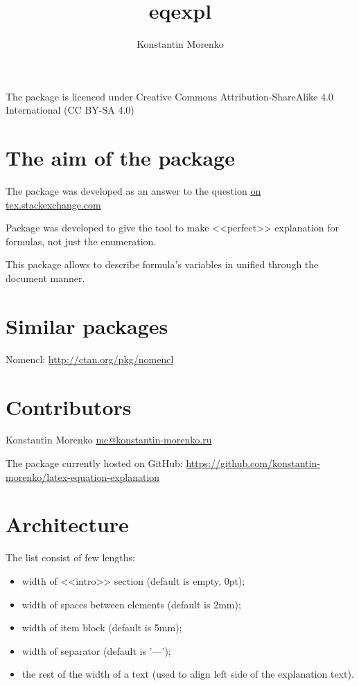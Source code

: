 \documentclass{article}
\begin{document}
\title{eqexpl}
\author{Konstantin Morenko}

\maketitle

The package is licenced under Creative Commons Attribution-ShareAlike
4.0 International (CC BY-SA 4.0)

\section{The aim of the package}

The package was developed as an answer to the question \href{https://tex.stackexchange.com/q/95838/119485}{on tex.stackexchange.com}

Package was developed to give the tool to make <<perfect>> explanation
for formulas, not just the enumeration.

This package allows to describe formula's variables in unified through
the document manner.

\section{Similar packages}

Nomencl: \href{http://ctan.org/pkg/nomencl}{http://ctan.org/pkg/nomencl}

\section{Contributors}

Konstantin Morenko \href{mailto:me@konstantin-morenko.ru}{me@konstantin-morenko.ru}

The package currently hosted on GitHub:
\href{https://github.com/konstantin-morenko/latex-equation-explanation}{https://github.com/konstantin-morenko/latex-equation-explanation}

\section{Architecture}

The list consist of few lengths:
\begin{itemize}
\item width of <<intro>> section (default is empty, 0pt);
\item width of spaces between elements (default is 2mm);
\item width of item block (default is 5mm);
\item width of separator (default is '---');
\item the rest of the width of a text (used to align left side of the
  explanation text).
\end{itemize}
\end{document}
